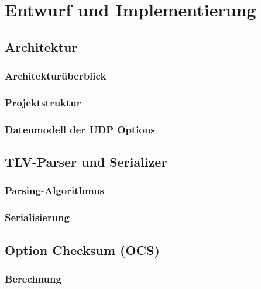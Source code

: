 
\chapter{Entwurf und Implementierung}
\label{chap:entwurf}

\section{Architektur}
\label{sec:architektur}

\subsection{Architekturüberblick}
\label{subsec:architektur-ueberblick}

\subsection{Projektstruktur}
\label{subsec:projektstruktur}

\subsection{Datenmodell der UDP Options}
\label{subsec:datenmodell}

\section{TLV-Parser und Serializer}
\label{sec:tlv}

\subsection{Parsing-Algorithmus}
\label{subsec:parsing}

\subsection{Serialisierung}
\label{subsec:serialisierung}

\section{Option Checksum (OCS)}
\label{sec:ocs}

\subsection{Berechnung}
\label{subsec:ocs-berechnung}

